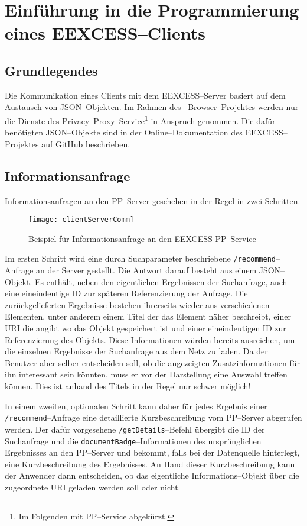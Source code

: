 \chapter{Einführung in die Programmierung eines EEXCESS--Clients}
\section{Grundlegendes}
Die Kommunikation eines Clients mit dem EEXCESS--Server basiert auf
dem Austausch von JSON--Objekten. Im Rahmen des
\SECH--Browser--Projektes werden nur die Dienste des
Privacy--Proxy--Service\footnote{Im Folgenden mit PP--Service
  abgekürzt.}  in Anspruch genommen. Die dafür benötigten
JSON--Objekte sind in der Online--Dokumentation des EEXCESS--Projektes
auf GitHub beschrieben.

\section{Informationsanfrage}
Informationsanfragen an den PP--Server geschehen in der Regel in zwei
Schritten.

\begin{figure}[h]
    \centering
    \texttt{[image: clientServerComm]}
    \caption{Beispiel für Informationsanfrage an den EEXCESS PP--Service}
    \label{fig:clientServerEEXCESS}
\end{figure}

Im ersten Schritt wird eine durch Suchparameter beschriebene
\Verb|/recommend|--Anfrage an der Server gestellt. Die Antwort darauf
besteht aus einem JSON--Objekt. Es enthält, neben den eigentlichen
Ergebnissen der Suchanfrage, auch eine eineindeutige ID zur späteren
Referenzierung der Anfrage. Die zurückgelieferten Ergebnisse bestehen
ihrerseits wieder aus verschiedenen Elementen, unter anderem einem
Titel der das Element näher beschreibt, einer URI die angibt wo das
Objekt gespeichert ist und einer eineindeutigen ID zur Referenzierung
des Objekts. Diese Informationen würden bereits ausreichen, um die einzelnen
Ergebnisse der Suchanfrage aus dem Netz zu laden. Da der Benutzer aber
selber entscheiden soll, ob die angezeigten Zusatzinformationen für
ihn interessant sein könnten, muss er vor der Darstellung eine Auswahl
treffen können. Dies ist anhand des Titels in der Regel nur schwer
möglich!

In einem zweiten, optionalen Schritt kann daher für jedes Ergebnis
einer \Verb|/recommend|--Anfrage eine detaillierte Kurzbeschreibung
vom PP--Server abgerufen werden. Der dafür vorgesehene
\Verb|/getDetails|--Befehl übergibt die ID der Suchanfrage und die
\Verb|documentBadge|--Informationen des ursprünglichen Ergebnisses an
den PP--Server und bekommt, falls bei der Datenquelle hinterlegt, eine
Kurzbeschreibung des Ergebnisses. An Hand dieser Kurzbeschreibung kann
der Anwender dann entscheiden, ob das eigentliche Informations--Objekt
über die zugeordnete URI geladen werden soll oder nicht.

